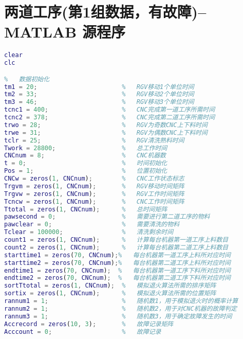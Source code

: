 \documentclass[no-math,withoutpreface,bwprint]{cumcmthesis} %
\numberwithin{equation}{section}
\numberwithin{figure}{section}
\numberwithin{table}{section}
\begin{document}
\section{ 两道工序(第1组数据，有故障)--MATLAB 源程序}
\begin{lstlisting}[language=matlab]
%   MATLAB初始化
clear
clc

%   数据初始化
tm1 = 20;                       %   RGV移动1个单位时间
tm2 = 33;                       %   RGV移动2个单位时间
tm3 = 46;                       %   RGV移动3个单位时间
tcnc1 = 400;                    %   CNC完成第一道工序所需时间
tcnc2 = 378;                    %   CNC完成第二道工序所需时间
trwo = 28;                      %   RGV为奇数CNC上下料时间
trwe = 31;                      %   RGV为偶数CNC上下料时间
tclr = 25;                      %   RGV清洗熟料时间
Twork = 28800;                  %   总工作时间
CNCnum = 8;                     %   CNC机器数
t = 0;                          %   时间初始化
Pos = 1;                        %   位置初始化
CNCw = zeros(1, CNCnum);        %   CNC工作状态标志
Trgvm = zeros(1, CNCnum);      	%   RGV移动时间矩阵
Trgvw = zeros(1, CNCnum);       %   RGV工作时间矩阵
Tcncw = zeros(1, CNCnum);       %   CNC工作时间矩阵
Ttotal = zeros(1, CNCnum);      %   总时间矩阵
pawsecond = 0;                  %   需要进行第二道工序的物料
pawclear = 0;                   %   需要清洗的物料
Tclear = 100000;                %   清洗剩余时间
count1 = zeros(1, CNCnum);      %   计算每台机器第一道工序上料数目
count2 = zeros(1, CNCnum);      %   计算每台机器第二道工序上料数目
starttime1 = zeros(70, CNCnum);%   每台机器第一道工序上料所对应时间
starttime2 = zeros(70, CNCnum);%   每台机器第二道工序上料所对应时间
endtime1 = zeros(70, CNCnum);  %   每台机器第一道工序下料所对应时间
endtime2 = zeros(70, CNCnum);  %   每台机器第二道工序下料所对应时间
sortTtotal = zeros(1, CNCnum);  %   模拟退火算法所需的排序矩阵
sortix = zeros(1, CNCnum);      %   模拟退火算法所需的位置矩阵
rannum1 = 1;                    %   随机数1，用于模拟退火时的概率计算
rannum2 = 1;                    %   随机数2，用于对CNC机器的故障判定
rannum3 = 1;                    %   随机数3，用于确定故障发生的时间
Accrecord = zeros(10, 3);       %   故障记录矩阵
Acccount = 0;                   %   故障记录


\end{lstlisting}
\end{document}
